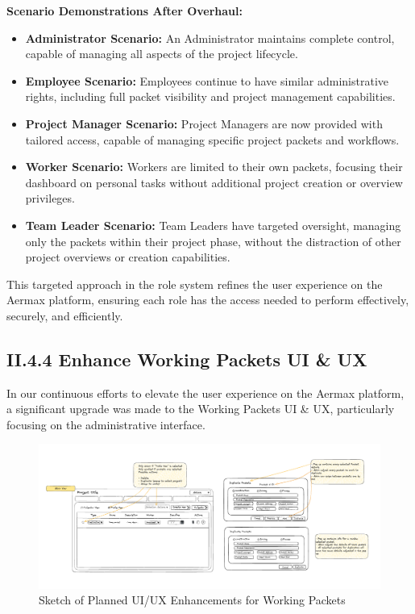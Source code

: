 \textbf{Scenario Demonstrations After Overhaul:}
\begin{itemize}
    \item \textbf{Administrator Scenario:} An Administrator maintains complete control, capable of managing all aspects of the project lifecycle.
    \item \textbf{Employee Scenario:} Employees continue to have similar administrative rights, including full packet visibility and project management capabilities.
    \item \textbf{Project Manager Scenario:} Project Managers are now provided with tailored access, capable of managing specific project packets and workflows.
    \item \textbf{Worker Scenario:} Workers are limited to their own packets, focusing their dashboard on personal tasks without additional project creation or overview privileges.
    \item \textbf{Team Leader Scenario:} Team Leaders have targeted oversight, managing only the packets within their project phase, without the distraction of other project overviews or creation capabilities.
\end{itemize}

This targeted approach in the role system refines the user experience on the Aermax platform, ensuring each role has the access needed to perform effectively, securely, and efficiently.

\subsection*{II.4.4 Enhance Working Packets UI \& UX}
In our continuous efforts to elevate the user experience on the Aermax platform, a significant upgrade was made to the Working Packets UI \& UX, particularly focusing on the administrative interface. 

\begin{figure}[H]
    \centering
    \includegraphics[width=1.1\textwidth]{src/assets/chapters/ui_ux-enhancement.png}
    \caption{Sketch of Planned UI/UX Enhancements for Working Packets }
    \label{fig:ui_ux_enhancements}
\end{figure}



